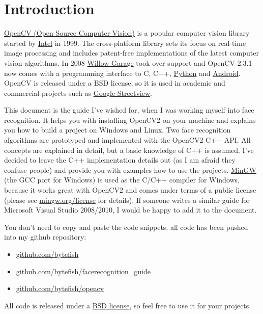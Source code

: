 \section{Introduction}

\href{http://opencv.willowgarage.com}{OpenCV (Open Source Computer Vision)} is a popular computer vision library started by \href{http://www.intel.com}{Intel} in 1999. The cross-platform library sets its focus on real-time image processing and includes patent-free implementations of the latest computer vision algorithms. In 2008 \href{http://www.willowgarage.com}{Willow Garage} took over support and OpenCV 2.3.1 now comes with a programming interface to C, C++, \href{http://www.python.org}{Python} and \href{http://www.android.com}{Android}. OpenCV is released under a BSD license, so it is used in academic and commercial projects such as \href{http://www.google.com/streetview}{Google Streetview}.

This document is the guide I've wished for, when I was working myself into face recognition. It helps you with installing OpenCV2 on your machine and explains you how to build a project on Windows and Linux. Two face recognition algorithms are prototyped and implemented with the OpenCV2 C++ API. All concepts are explained in detail, but a basic knowledge of C++ is assumed. I've decided to leave the C++ implementation details out (as I am afraid they confuse people) and provide you with examples how to use the projects. \href{http://www.mingw.org}{MinGW} (the GCC port for Windows) is used as the C/C++ compiler for Windows, because it works great with OpenCV2 and comes under terms of a public license (please see \href{http://www.mingw.org/license}{mingw.org/license} for details). If someone writes a similar guide for Microsoft Visual Studio 2008/2010, I would be happy to add it to the document.

You don't need to copy and paste the code snippets, all code has been pushed into my github repository:
\begin{itemize}
  \item \href{http://www.github.com/bytefish}{github.com/bytefish}
  \item \href{http://www.github.com/bytefish/facerecognition_guide}{github.com/bytefish/facerecognition\_guide}
  \item \href{http://www.github.com/bytefish/opencv}{github.com/bytefish/opencv}
\end{itemize}

All code is released under a \href{http://www.opensource.org/licenses/bsd-license}{BSD license}, so feel free to use it for your projects.
